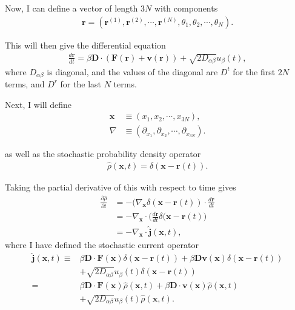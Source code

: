 \documentclass[twocolumn,amsmath,amssymb,aps]{revtex4-1}%
\begin{document}
Now, I can define a vector of length $3N$ with components
\begin{align}
  \bm{r}=(\bm{r}^{(1)},\bm{r}^{(2)},\cdots,\bm{r}^{(N)},\theta_1,\theta_2,\cdots,
  \theta_N).
\end{align}

This will then give the differential equation
\begin{align}
  \frac{d\bm{r}}{dt}=\beta\bm{D}\cdot(\bm{F}(\bm{r})+\bm{v}(\bm{r}))
  +\sqrt{2D_{\alpha\beta}}u_{\beta}(t),
\end{align}
where $D_{\alpha\beta}$ is diagonal, and the values of the diagonal are
$D^t$ for the first $2N$ terms, and $D^r$ for the last $N$ terms.

Next, I will define
\begin{align}
  \bm{x}&\equiv(x_1,x_2,\cdots,x_{3N}),\\
  \nabla&\equiv(\partial_{x_1},\partial_{x_2},\cdots,\partial_{x_{3N}}).
\end{align}

as well as the stochastic probability density operator
\begin{align}
  \hat{\rho}(\bm{x},t)=\delta(\bm{x}-\bm{r}(t)).
\end{align}

Taking the partial derivative of this with respect to time gives
\begin{align}
  \frac{\partial\hat{\rho}}{\partial t}
  &=-(\nabla_{\bm{x}}\delta(\bm{x}-\bm{r}(t))
  \cdot\frac{d\bm{r}}{dt}\nonumber\\
  &=-\nabla_{\bm{x}}\cdot\bigg(\frac{d\bm{r}}{dt}
  \delta(\bm{x}-\bm{r}(t)\bigg)\nonumber\\
  &=-\nabla_{\bm{x}}\cdot\hat{\bm{j}}(\bm{x},t),
\end{align}
where I have defined the stochastic current operator
\begin{align}
  \hat{\bm{j}}(\bm{x},t)\equiv
  &\beta\bm{D}\cdot\bm{F}(\bm{x})\delta(\bm{x}-\bm{r}(t))
  +\beta\bm{D}\bm{v}(\bm{x})\delta(\bm{x}-\bm{r}(t))\nonumber\\
  &+\sqrt{2D_{\alpha\beta}}u_{\beta}(t)
  \delta(\bm{x}-\bm{r}(t))\nonumber\\
  =&\beta\bm{D}\cdot\bm{F}(\bm{x})\hat{\rho}(\bm{x},t)
  +\beta\bm{D}\cdot\bm{v}(\bm{x})\hat{\rho}(\bm{x},t)\nonumber\\
  &+\sqrt{2D_{\alpha\beta}}u_{\beta}(t)\hat{\rho}(\bm{x},t).
\end{align}
\end{document}
